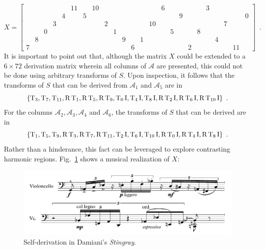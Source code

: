 \begin{example}
    \begin{equation}
        X = \left[
        \begin{array}{cccccccccccc|cccccccccccc}
            &&&&& 11 && 10 &&&&&&& 6 &&&&& 3 &&&& \\
            &&&& 4 && 5 &&&&&&&&&& 9 &&&&&&& 0 \\
            &&& 3 &&&&& 2 &&&&& 10 &&&&&&&& 7 && \\
            && 0 &&&&&&& 1 &&&&&& 5 &&& 8 &&&&& \\
            & 8 &&&&&&&&& 9 && 1 &&&&&&&& 4 &&& \\
            7 &&&&&&&&&&& 6 &&&&&& 2 &&&&& 11 &
        \end{array}
        \right] \enspace.
    \end{equation}
    It is important to point out that, although the matrix $X$ could be extended to a $6 \times 72$ derivation matrix wherein all columns of $\mathcal{A}$ are presented, this could not be done using arbitrary transforms of $S$. Upon inspection, it follows that the transforms of $S$ that can be derived from $\mathcal{A}_1$ and $\mathcal{A}_5$ are in
    \begin{equation}
        \{ \operatorname{T}_3, \operatorname{T}_7, \operatorname{T}_{11}, \operatorname{R}\operatorname{T}_1, \operatorname{R}\operatorname{T}_5, \operatorname{R}\operatorname{T}_9, \operatorname{T}_0\operatorname{I}, \operatorname{T}_4\operatorname{I}, \operatorname{T}_8\operatorname{I}, \operatorname{R}\operatorname{T}_2\operatorname{I}, \operatorname{R}\operatorname{T}_6\operatorname{I}, \operatorname{R}\operatorname{T}_{10}\operatorname{I} \} \enspace.
    \end{equation}
    For the columns $\mathcal{A}_2, \mathcal{A}_3, \mathcal{A}_4$ and $\mathcal{A}_6$, the transforms of $S$ that can be derived are in
    \begin{equation}
        \{ \operatorname{T}_1, \operatorname{T}_5, \operatorname{T}_9, \operatorname{R}\operatorname{T}_3, \operatorname{R}\operatorname{T}_7, \operatorname{R}\operatorname{T}_{11}, \operatorname{T}_2\operatorname{I}, \operatorname{T}_6\operatorname{I}, \operatorname{T}_{10}\operatorname{I}, \operatorname{R}\operatorname{T}_0\operatorname{I}, \operatorname{R}\operatorname{T}_4\operatorname{I}, \operatorname{R}\operatorname{T}_8\operatorname{I} \} \enspace.
    \end{equation}
    Rather than a hinderance, this fact can be leveraged to explore contrasting harmonic regions. Fig.~\ref{fig:stingray} shows a musical realization of $X$:
    \begin{figure}[htbp]
        \centering
        \includegraphics[width=6.5in]{figures/stingray-example.pdf}
        \caption[Self-derivation in Damiani's \emph{Stingray}.]{Self-derivation in Damiani's \emph{Stingray}.}
        \label{fig:stingray}
    \end{figure}
\end{example}

